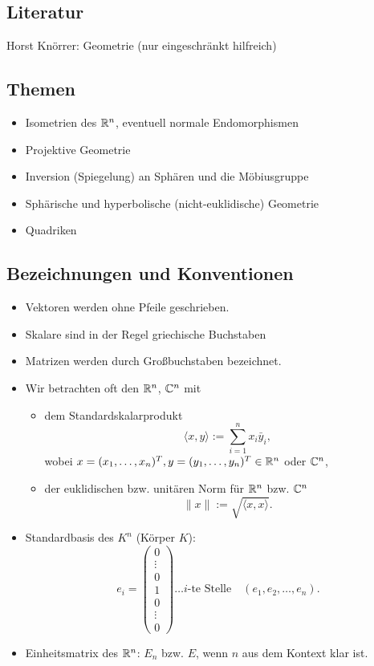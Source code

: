 \documentclass[
 a4paper,
 12pt,
 parskip=half
 ]{scrartcl}
\theoremstyle{plain}
\theoremstyle{definition}
\numberwithin{equation}{section}
\begin{document}
\subsection{Literatur}
Horst Knörrer: Geometrie (nur eingeschränkt hilfreich)

\subsection{Themen}
\begin{itemize}
 \item Isometrien des $\mathbb{R}^n$, eventuell normale Endomorphismen
 \item Projektive Geometrie
 \item Inversion (Spiegelung) an Sphären und die Möbiusgruppe
 \item Sphärische und hyperbolische (nicht-euklidische) Geometrie
 \item Quadriken
\end{itemize}

\subsection{Bezeichnungen und Konventionen}
\begin{itemize}
 \item Vektoren werden ohne Pfeile geschrieben.
 \item Skalare sind in der Regel griechische Buchstaben
 \item Matrizen werden durch Großbuchstaben bezeichnet.
 \item Wir betrachten oft den $\mathbb{R}^n$, $\mathbb{C}^n$ mit 
  \begin{itemize}
   \item dem Standardskalarprodukt
    \[ \langle x, y \rangle := \sum_{i=1}^n x_i \bar{y}_i, \]
    wobei $x = (x_1, \ldots, x_n)^T, y = (y_1, \ldots, y_n)^T \in \mathbb{R}^n$ oder $\mathbb{C}^n$, 
   \item der euklidischen bzw. unitären Norm für $\mathbb{R}^n$ bzw. $\mathbb{C}^n$
    \[ \| x \| := \sqrt{ \langle x,x \rangle }. \]
  \end{itemize}
 \item Standardbasis des $K^n$ (Körper $K$):
  \[ e_i = \begin{pmatrix} 0 \\ \vdots \\ 0 \\ 1 \\ 0 \\ \vdots \\ 0 \end{pmatrix} \ldots i\text{-te Stelle} \quad (e_1, e_2, \ldots, e_n). \]
 \item Einheitsmatrix des $\mathbb{R}^n$: $E_n$ bzw. $E$, wenn $n$ aus dem Kontext klar ist.
\end{itemize}
\end{document}

